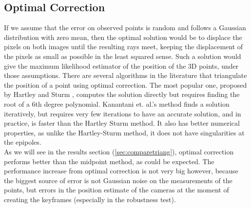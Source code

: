 \subsection{Optimal Correction}
If we assume that the error on observed points is random and follows a Gaussian distribution with zero mean, then the optimal solution would be to displace the pixels on both images until the resulting rays meet, keeping the displacement of the pixels as small as possible in the least squared sense. Such a solution would give the maximum likelihood estimator of the position of the 3D points, under those assumptions.
There are several algorithms in the literature that triangulate the position of a point using optimal correction. The most popular one, proposed by Hartley and Sturm \cite{hartleysturm}, computes the solution directly but requires finding the root of a 6th degree polynomial. Kanantani et. al.'s method \cite{kanatani} finds a solution iteratively, but requires very few iterations to have an accurate solution, and in practice, is faster than the Hartley Sturm method. It also has better numerical properties, as unlike the Hartley-Sturm method, it does not have singularities at the epipoles.\\
As we will see in the results section (\ref{sec:comparetriang}), optimal correction performs better than the midpoint method, as could be expected. The performance increase from optimal correction is not very big however, because the biggest source of error is not Gaussian noise on the measurements of the points, but errors in the position estimate of the cameras at the moment of creating the keyframes (especially in the robustness test).

